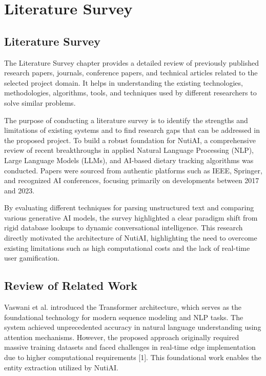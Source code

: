 \documentclass[12pt,a4paper]{report}
\begin{document}
\chapter{Literature Survey}

\section{Literature Survey}
The Literature Survey chapter provides a detailed review of previously published research papers, journals, conference papers, and technical articles related to the selected project domain. It helps in understanding the existing technologies, methodologies, algorithms, tools, and techniques used by different researchers to solve similar problems.

The purpose of conducting a literature survey is to identify the strengths and limitations of existing systems and to find research gaps that can be addressed in the proposed project. To build a robust foundation for NutiAI, a comprehensive review of recent breakthroughs in applied Natural Language Processing (NLP), Large Language Models (LLMs), and AI-based dietary tracking algorithms was conducted. Papers were sourced from authentic platforms such as IEEE, Springer, and recognized AI conferences, focusing primarily on developments between 2017 and 2023.

By evaluating different techniques for parsing unstructured text and comparing various generative AI models, the survey highlighted a clear paradigm shift from rigid database lookups to dynamic conversational intelligence. This research directly motivated the architecture of NutiAI, highlighting the need to overcome existing limitations such as high computational costs and the lack of real-time user gamification.

\section{Review of Related Work}
Vaswani et al. introduced the Transformer architecture, which serves as the foundational technology for modern sequence modeling and NLP tasks. The system achieved unprecedented accuracy in natural language understanding using attention mechanisms. However, the proposed approach originally required massive training datasets and faced challenges in real-time edge implementation due to higher computational requirements [1]. This foundational work enables the entity extraction utilized by NutiAI.
\end{document}
